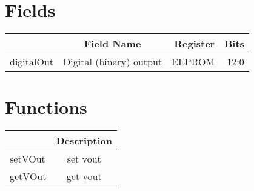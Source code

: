 \documentclass[a4paper,12pt,oneside,pdflatex,italian,final,twocolumn]{article}
\begin{document}
\section{Fields}

\centering
\begin{tabular}{lcrr}
\toprule
  & Field Name & Register & Bits \\
\midrule
digitalOut & Digital (binary) output & EEPROM &
12:0
\\

\bottomrule
\end{tabular}

\raggedright


\section{Functions}

\centering
\begin{tabular}{lc}
\toprule
  & Description \\
\midrule
setVOut & set vout \\
getVOut & get vout \\
\bottomrule
\end{tabular}

\raggedright
\end{document}
